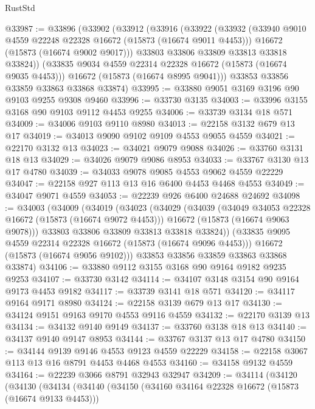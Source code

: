 \begin{lexlean}{RustStd}
\begin{coremodule}
@33987 := @33896
    (@33902
      (@33912
        (@33916
          (@33922
            (@33932
              (@33940 @9010 @4559 @22248 @22328 @16672 (@15873 (@16674 @9011 @4453)))
              @16672
              (@15873 (@16674 @9002 @9017)))
            @33803
            @33806
            @33809
            @33813
            @33818
            @33824))
        (@33835 @9034 @4559 @22314 @22328 @16672 (@15873 (@16674 @9035 @4453)))
        @16672
        (@15873 (@16674 @8995 @9041)))
      @33853
      @33856
      @33859
      @33863
      @33868
      @33874)
@33995 := @33880 @9051 @3169 @3196 @90 @9103 @9255 @9308 @9460
@33996 := @33730 @3135
@34003 := @33996 @3155 @3168 @90 @9103 @9112 @4453 @9255
@34006 := @33739 @3134 @18 @571
@34009 := @34006 @9103 @9110 @8980
@34013 := @22158 @3132 @679 @13 @17
@34019 := @34013 @9090 @9102 @9109 @4553 @9055 @4559
@34021 := @22170 @3132 @13
@34023 := @34021 @9079 @9088
@34026 := @33760 @3131 @18 @13
@34029 := @34026 @9079 @9086 @8953
@34033 := @33767 @3130 @13 @17 @4780
@34039 := @34033 @9078 @9085 @4553 @9062 @4559 @22229
@34047 := @22158 @927 @113 @13 @16 @6400 @4453 @4468 @4553
@34049 := @34047 @9071 @4559
@34053 := @22239 @926 @6400 @24688 @24692
@34098 := @34003
    (@34009
      (@34019
        (@34023
          (@34029
            (@34039
              (@34049 @34053 @22328 @16672 (@15873 (@16674 @9072 @4453)))
              @16672
              (@15873 (@16674 @9063 @9078)))
            @33803
            @33806
            @33809
            @33813
            @33818
            @33824))
        (@33835 @9095 @4559 @22314 @22328 @16672 (@15873 (@16674 @9096 @4453)))
        @16672
        (@15873 (@16674 @9056 @9102)))
      @33853
      @33856
      @33859
      @33863
      @33868
      @33874)
@34106 := @33880 @9112 @3155 @3168 @90 @9164 @9182 @9235 @9253
@34107 := @33730 @3142
@34114 := @34107 @3148 @3154 @90 @9164 @9173 @4453 @9182
@34117 := @33739 @3141 @18 @571
@34120 := @34117 @9164 @9171 @8980
@34124 := @22158 @3139 @679 @13 @17
@34130 := @34124 @9151 @9163 @9170 @4553 @9116 @4559
@34132 := @22170 @3139 @13
@34134 := @34132 @9140 @9149
@34137 := @33760 @3138 @18 @13
@34140 := @34137 @9140 @9147 @8953
@34144 := @33767 @3137 @13 @17 @4780
@34150 := @34144 @9139 @9146 @4553 @9123 @4559 @22229
@34158 := @22158 @3067 @113 @13 @16 @8791 @4453 @4468 @4553
@34160 := @34158 @9132 @4559
@34164 := @22239 @3066 @8791 @32943 @32947
@34209 := @34114
    (@34120
      (@34130
        (@34134
          (@34140
            (@34150
              (@34160 @34164 @22328 @16672 (@15873 (@16674 @9133 @4453)))

\end{coremodule}
\end{lexlean}
